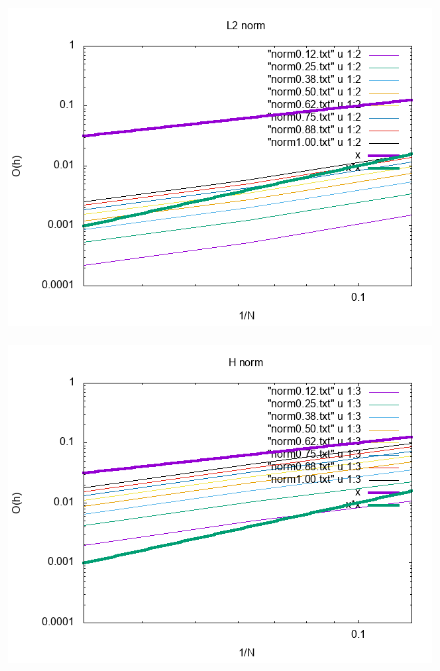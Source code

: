 \documentclass[a4paper,10pt]{article}
\begin{document}
\begin{figure}[h!]
	\centering
	\includegraphics[width=0.7\linewidth]{picture/L2norm}
	\caption{}
	\label{fig:l2norm}
\end{figure}
\begin{figure}[h!]
	\centering
	\includegraphics[width=0.7\linewidth]{picture/Hnorm}
	\caption{}
	\label{fig:hnorm}
\end{figure}
\end{document}
